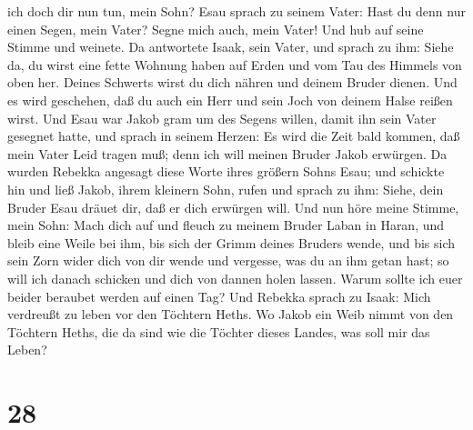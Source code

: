 ich doch dir nun tun, mein Sohn?  Esau sprach zu seinem
Vater: Hast du denn nur einen Segen, mein Vater? Segne mich auch, mein
Vater! Und hub auf seine Stimme und weinete.  Da antwortete
Isaak, sein Vater, und sprach zu ihm: Siehe da, du wirst eine fette
Wohnung haben auf Erden und vom Tau des Himmels von oben her.
 Deines Schwerts wirst du dich nähren und deinem Bruder
dienen. Und es wird geschehen, daß du auch ein Herr und sein Joch von
deinem Halse reißen wirst.  Und Esau war Jakob gram um des
Segens willen, damit ihn sein Vater gesegnet hatte, und sprach in seinem
Herzen: Es wird die Zeit bald kommen, daß mein Vater Leid tragen muß;
denn ich will meinen Bruder Jakob erwürgen.  Da wurden
Rebekka angesagt diese Worte ihres größern Sohns Esau; und schickte hin
und ließ Jakob, ihrem kleinern Sohn, rufen und sprach zu ihm: Siehe,
dein Bruder Esau dräuet dir, daß er dich erwürgen will. 
Und nun höre meine Stimme, mein Sohn: Mach dich auf und fleuch zu meinem
Bruder Laban in Haran,  und bleib eine Weile bei ihm, bis
sich der Grimm deines Bruders wende,  und bis sich sein
Zorn wider dich von dir wende und vergesse, was du an ihm getan hast; so
will ich danach schicken und dich von dannen holen lassen. Warum sollte
ich euer beider beraubet werden auf einen Tag?  Und Rebekka
sprach zu Isaak: Mich verdreußt zu leben vor den Töchtern Heths. Wo
Jakob ein Weib nimmt von den Töchtern Heths, die da sind wie die Töchter
dieses Landes, was soll mir das Leben?

\hypertarget{section-27}{%
\section{28}\label{section-27}}

